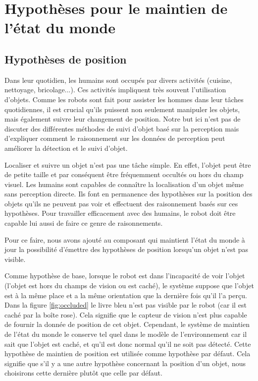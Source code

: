 \documentclass[a4paper,11pt,twoside]{StyleThese}
\begin{document}
\section{Hypothèses pour le maintien de l'état du monde}
\label{sec:hypo}
\subsection{Hypothèses de position}


Dans leur quotidien, les humains sont occupés par divers activités (cuisine, nettoyage, bricolage...). Ces activités impliquent très souvent l'utilisation d'objets. Comme les robots sont fait pour assister les hommes dans leur tâches quotidiennes, il est crucial qu'ils puissent non seulement manipuler les objets, mais également suivre leur changement de position. Notre but ici n'est pas de discuter des différentes méthodes de suivi d'objet basé sur la perception mais d'expliquer comment le raisonnement sur les données de perception peut améliorer la détection et le suivi d'objet.

Localiser et suivre un objet n'est pas une tâche simple. En effet, l'objet peut être de petite taille et par conséquent être fréquemment occultés ou hors du champ visuel.
Les humains sont capables de connaître la localisation d'un objet même sans perception directe. Ils font en permanence des hypothèses sur la position des objets qu'ils ne peuvent pas voir et effectuent des raisonnement basés sur ces hypothèses. Pour travailler efficacement avec des humains, le robot doit être capable lui aussi de faire ce genre de raisonnements.

Pour ce faire, nous avons ajouté au composant qui maintient l'état du monde à jour la possibilité d'émettre des hypothèses de position lorsqu'un objet n'est pas visible.

Comme hypothèse de base, lorsque le robot est dans l'incapacité de voir l'objet (l'objet est hors du champs de vision ou est caché), le système suppose que l'objet est à la même place et a la même orientation que la dernière fois qu'il l'a perçu. Dans la figure \ref{fig:occluded} 
le livre bleu n'est pas visible par le robot (car il est caché par la boîte rose). Cela signifie que le capteur de vision n'est plus capable de fournir la donnée de position de cet objet. Cependant, le système de maintien de l'état du monde le conserve tel quel dans le modèle de l'environnement car il sait que l'objet est caché, et qu'il est donc normal qu'il ne soit pas détecté. Cette hypothèse de maintien de position est utilisée comme hypothèse par défaut. Cela signifie que s'il y a une autre hypothèse concernant la position d'un objet, nous choisirons cette dernière plutôt que celle par défaut.
\end{document}
